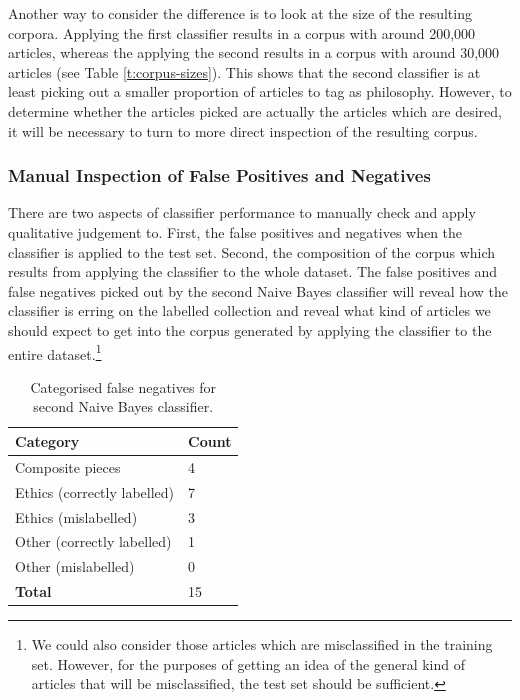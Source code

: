 \documentclass{article}
\begin{document}
Another way to consider the difference is to look at the size of the resulting corpora. Applying the first classifier results in a corpus with around 200,000 articles, whereas the applying the second results in a corpus with around 30,000 articles (see Table \ref{t:corpus-sizes}). This shows that the second classifier is at least picking out a smaller proportion of articles to tag as philosophy. However, to determine whether the articles picked are actually the articles which are desired, it will be necessary to turn to more direct inspection of the resulting corpus.

\subsubsection{Manual Inspection of False Positives and Negatives}

There are two aspects of classifier performance to manually check and apply qualitative judgement to. First, the false positives and negatives when the classifier is applied to the test set. Second, the composition of the corpus which results from applying the classifier to the whole dataset. The false positives and false negatives picked out by the second Naive Bayes classifier will reveal how the classifier is erring on the labelled collection and reveal what kind of articles we should expect to get into the corpus generated by applying the classifier to the entire dataset.\footnote{We could also consider those articles which are misclassified in the training set. However, for the purposes of getting an idea of the general kind of articles that will be misclassified, the test set should be sufficient.}

\begin{table}[]
        \centering
        \footnotesize
        \begin{tabular}{l|l}
          Category & Count \\
          \hline
          Composite pieces & 4 \\
          Ethics (correctly labelled) & 7 \\
          Ethics (mislabelled) & 3 \\
          Other (correctly labelled) & 1\\
          Other (mislabelled) & 0 \\
          \textbf{Total} & 15\\
        \end{tabular}
        \caption{Categorised false negatives for second Naive Bayes classifier.}
        \label{t:false-negatives}
\end{table}
\end{document}
